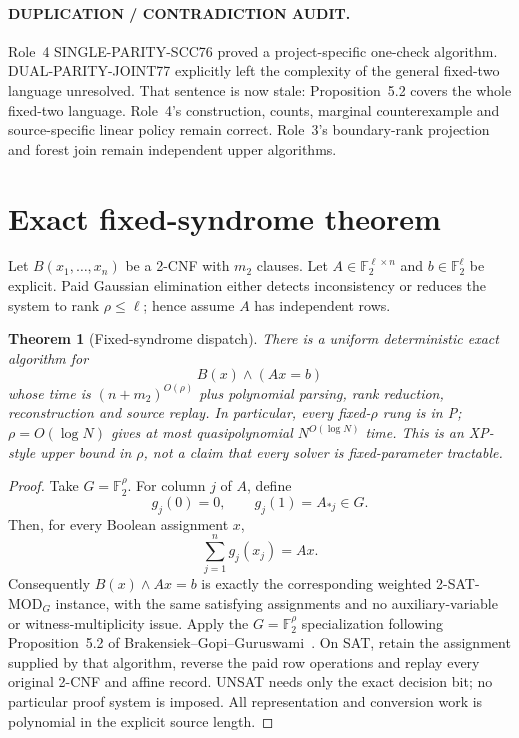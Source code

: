 \documentclass[11pt]{article}
\newtheorem{theorem}{Theorem}
\begin{document}
\paragraph{DUPLICATION / CONTRADICTION AUDIT.}
Role~4 SINGLE-PARITY-SCC76 proved a project-specific one-check algorithm.
DUAL-PARITY-JOINT77 explicitly left the complexity of the general fixed-two
language unresolved.  That sentence is now stale: Proposition~5.2 covers
the whole fixed-two language.  Role~4's construction, counts, marginal
counterexample and source-specific linear policy remain correct.  Role~3's
boundary-rank projection and forest join remain independent upper algorithms.

\section{Exact fixed-syndrome theorem}
Let $B(x_1,\ldots,x_n)$ be a 2-CNF with $m_2$ clauses.  Let
$A\in\mathbb F_2^{\ell\times n}$ and $b\in\mathbb F_2^\ell$ be explicit.
Paid Gaussian elimination either detects inconsistency or reduces the system
to rank $\rho\le\ell$; hence assume $A$ has independent rows.

\begin{theorem}[Fixed-syndrome dispatch]\label{thm:fixed}
There is a uniform deterministic exact algorithm for
\[
B(x)\wedge(Ax=b)
\]
whose time is $(n+m_2)^{O(\rho)}$ plus polynomial parsing, rank reduction,
reconstruction and source replay.  In particular, every fixed-$\rho$ rung is
in P; $\rho=O(\log N)$ gives at most quasipolynomial
$N^{O(\log N)}$ time.  This is an XP-style upper bound in $\rho$, not a claim
that every solver is fixed-parameter tractable.
\end{theorem}
\begin{proof}
Take $G=\mathbb F_2^\rho$.  For column $j$ of $A$, define
\[
g_j(0)=0,\qquad g_j(1)=A_{*j}\in G.
\]
Then, for every Boolean assignment $x$,
\[
\sum_{j=1}^n g_j(x_j)=Ax.
\]
Consequently $B(x)\wedge Ax=b$ is exactly the corresponding weighted
2-SAT-MOD$_G$ instance, with the same satisfying assignments and no
auxiliary-variable or witness-multiplicity issue.  Apply the
$G=\mathbb F_2^\rho$ specialization following Proposition~5.2 of
Brakensiek--Gopi--Guruswami~\cite{BGG}.  On SAT, retain the assignment supplied
by that algorithm, reverse the paid row operations and replay every original
2-CNF and affine record.  UNSAT needs only the exact decision bit; no
particular proof system is imposed.  All representation and conversion work
is polynomial in the explicit source length.
\end{proof}
\end{document}
